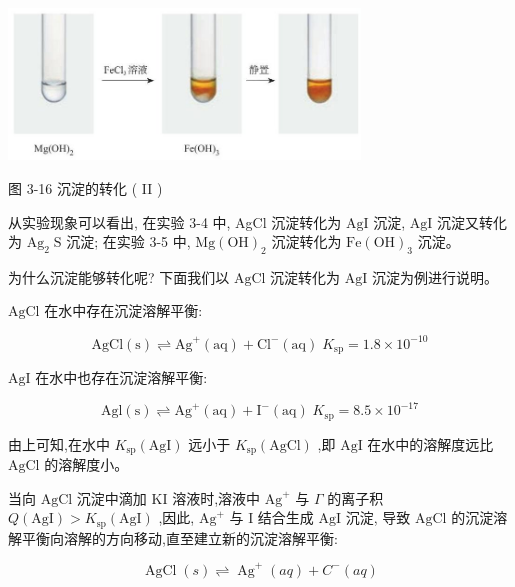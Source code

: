 \documentclass[10pt]{article}
\begin{document}
\begin{center}
\includegraphics[max width=0.7\textwidth]{images/0190da9d-8bfd-732f-bc2c-0b21d0f13b91_89_419160.jpg}
\end{center}

图 3-16 沉淀的转化 ( II )

从实验现象可以看出, 在实验 3-4 中, AgCl 沉淀转化为 \(\mathrm{{AgI}}\) 沉淀, \(\mathrm{{AgI}}\) 沉淀又转化为 \({\mathrm{{Ag}}}_{2}\mathrm{\;S}\) 沉淀; 在实验 3-5 中, \(\mathrm{{Mg}}{\left( \mathrm{{OH}}\right) }_{2}\) 沉淀转化为 \(\mathrm{{Fe}}{\left( \mathrm{{OH}}\right) }_{3}\) 沉淀。

为什么沉淀能够转化呢? 下面我们以 \(\mathrm{{AgCl}}\) 沉淀转化为 \(\mathrm{{AgI}}\) 沉淀为例进行说明。

\(\mathrm{{AgCl}}\) 在水中存在沉淀溶解平衡:

\[
\mathrm{{AgCl}}\left( \mathrm{s}\right) \rightleftharpoons {\mathrm{{Ag}}}^{ + }\left( \mathrm{{aq}}\right) + {\mathrm{{Cl}}}^{ - }\left( \mathrm{{aq}}\right) \;{K}_{\mathrm{{sp}}} = {1.8} \times {10}^{-{10}}
\]

\(\mathrm{{AgI}}\) 在水中也存在沉淀溶解平衡:

\[
\mathrm{{Agl}}\left( \mathrm{s}\right) \rightleftharpoons {\mathrm{{Ag}}}^{ + }\left( \mathrm{{aq}}\right) + {\mathrm{I}}^{ - }\left( \mathrm{{aq}}\right) \;{K}_{\mathrm{{sp}}} = {8.5} \times {10}^{-{17}}
\]

由上可知,在水中 \({K}_{\mathrm{{sp}}}\left( \mathrm{{AgI}}\right)\) 远小于 \({K}_{\mathrm{{sp}}}\left( \mathrm{{AgCl}}\right)\) ,即 \(\mathrm{{AgI}}\) 在水中的溶解度远比 \(\mathrm{{AgCl}}\) 的溶解度小。

当向 \(\mathrm{{AgCl}}\) 沉淀中滴加 \(\mathrm{{KI}}\) 溶液时,溶液中 \({\mathrm{{Ag}}}^{ + }\) 与 \(\Gamma\) 的离子积 \(Q\left( \mathrm{{AgI}}\right) > {K}_{\mathrm{{sp}}}\left( \mathrm{{AgI}}\right)\) ,因此, \({\mathrm{{Ag}}}^{ + }\) 与 I 结合生成 \(\mathrm{{AgI}}\) 沉淀, 导致 \(\mathrm{{AgCl}}\) 的沉淀溶解平衡向溶解的方向移动,直至建立新的沉淀溶解平衡:

\[
\operatorname{AgCl}\left( s\right) \rightleftharpoons {\operatorname{Ag}}^{ + }\left( {aq}\right) + {C}^{ - }\left( {aq}\right)
\]
\end{document}
